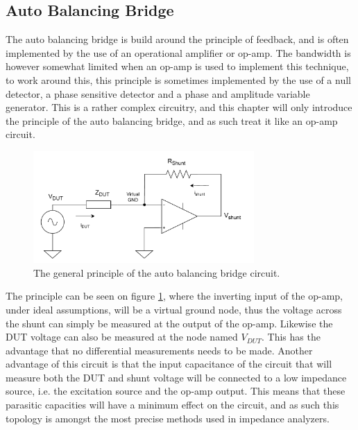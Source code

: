 \subsection{Auto Balancing Bridge} \label{ssec:AutoBalanceBridge}
The auto balancing bridge is build around the principle of feedback, and is often implemented by the use of an operational amplifier or op-amp. The bandwidth is however somewhat limited when an op-amp is used to implement this technique, to work around this, this principle is sometimes implemented by the use of a null detector, a phase sensitive detector and a phase and amplitude variable generator. This is a rather complex circuitry, and this chapter will only introduce the principle of the auto balancing bridge, and as such treat it like 
an op-amp circuit.

\begin{figure}[H]
    \centering
    \includegraphics[width=0.75\textwidth]{Sections/4_TechnicalAnalysis/Figures_JFT/AutoBalanceBridge.pdf}
    \caption{The general principle of the auto balancing bridge circuit.}
    \label{fig_4_2_AutoBalanceBridge}
\end{figure}

The principle can be seen on figure \ref{fig_4_2_AutoBalanceBridge}, where the inverting input of the op-amp, under ideal assumptions, will be a virtual ground node, thus the voltage across the shunt can simply be measured at the output of the op-amp. Likewise the DUT voltage can also be measured at the node named $V_{DUT}$. This has the advantage that no differential measurements needs to be made. Another
advantage of this circuit is that the input capacitance of the circuit that will measure both the DUT and shunt voltage will be connected
to a low impedance source, i.e. the excitation source and the op-amp output. This means that these parasitic capacities will have a minimum effect on the circuit, and as such this topology is amongst the most precise methods used in impedance analyzers.

